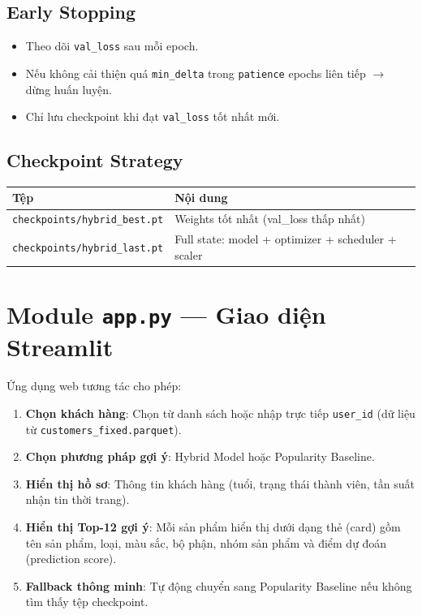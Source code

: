 \documentclass[12pt,a4paper]{article}
\begin{document}
\subsection{Early Stopping}

\begin{itemize}[leftmargin=2em]
    \item Theo dõi \texttt{val\_loss} sau mỗi epoch.
    \item Nếu không cải thiện quá \texttt{min\_delta} trong \texttt{patience} epochs
          liên tiếp $\to$ dừng huấn luyện.
    \item Chỉ lưu checkpoint khi đạt \texttt{val\_loss} tốt nhất mới.
\end{itemize}

\subsection{Checkpoint Strategy}

\begin{table}[H]
\centering
\begin{tabular}{ll}
\toprule
\textbf{Tệp} & \textbf{Nội dung} \\
\midrule
\texttt{checkpoints/hybrid\_best.pt} & Weights tốt nhất (val\_loss thấp nhất) \\
\texttt{checkpoints/hybrid\_last.pt} & Full state: model + optimizer + scheduler + scaler \\
\bottomrule
\end{tabular}
\end{table}

\section{Module \texttt{app.py} — Giao diện Streamlit}

Ứng dụng web tương tác cho phép:

\begin{enumerate}[leftmargin=2em]
    \item \textbf{Chọn khách hàng}: Chọn từ danh sách hoặc nhập trực tiếp \texttt{user\_id}
          (dữ liệu từ \texttt{customers\_fixed.parquet}).
    \item \textbf{Chọn phương pháp gợi ý}: Hybrid Model hoặc Popularity Baseline.
    \item \textbf{Hiển thị hồ sơ}: Thông tin khách hàng (tuổi, trạng thái thành viên,
          tần suất nhận tin thời trang).
    \item \textbf{Hiển thị Top-12 gợi ý}: Mỗi sản phẩm hiển thị dưới dạng thẻ
          (card) gồm tên sản phẩm, loại, màu sắc, bộ phận, nhóm sản phẩm và
          điểm dự đoán (prediction score).
    \item \textbf{Fallback thông minh}: Tự động chuyển sang Popularity Baseline
          nếu không tìm thấy tệp checkpoint.
\end{enumerate}
\end{document}
